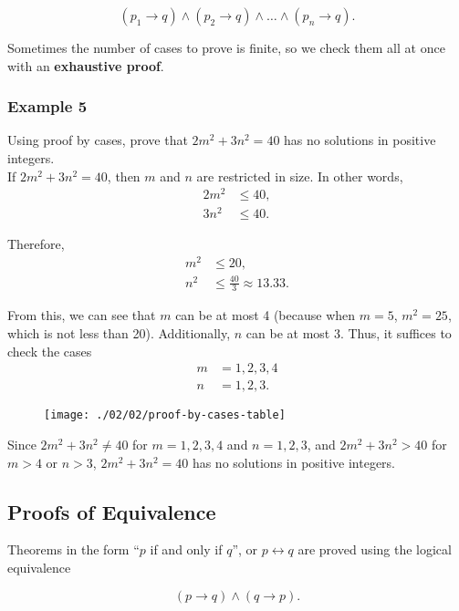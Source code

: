 \[
    (p_1 \rightarrow q) \land (p_2 \rightarrow q) \land \dots \land (p_n \rightarrow q).
\]

Sometimes the number of cases to prove is finite, so we check them all at once with an \textbf{exhaustive proof}.

\subsubsection*{Example 5}

Using proof by cases, prove that $2m^2 + 3n^2 = 40$ has no solutions in positive integers.\\

If $2m^2 + 3n^2 = 40$, then $m$ and $n$ are restricted in size.  In other words,
\begin{align*}
    2m^2 &\leq 40,\\
    3n^2 &\leq 40.
\end{align*}

Therefore,
\begin{align*}
    m^2 &\leq 20,\\
    n^2 &\leq \frac{40}{3} \approx 13.33.
\end{align*}

From this, we can see that $m$ can be at most 4 (because when $m = 5$, $m^2 = 25$, which is not less than 20).  Additionally, $n$ can be at most 3.  Thus, it suffices to check the cases
\begin{align*}
    m &= 1, 2, 3, 4\\
    n &= 1, 2, 3.
\end{align*}

\begin{figure}[h]
\texttt{[image: ./02/02/proof-by-cases-table]}
\centering
\end{figure}

Since $2m^2 + 3n^2 \neq 40$ for $m = 1, 2, 3, 4$ and $n = 1, 2, 3$, and $2m^2 + 3n^2 > 40$ for $m > 4$ or $n > 3$, $2m^2 + 3n^2 = 40$ has no solutions in positive integers.

\subsection*{Proofs of Equivalence}

Theorems in the form ``$p$ if and only if $q$'', or $p \leftrightarrow q$ are proved using the logical equivalence

\[
    (p \rightarrow q) \land (q \rightarrow p).
\]

